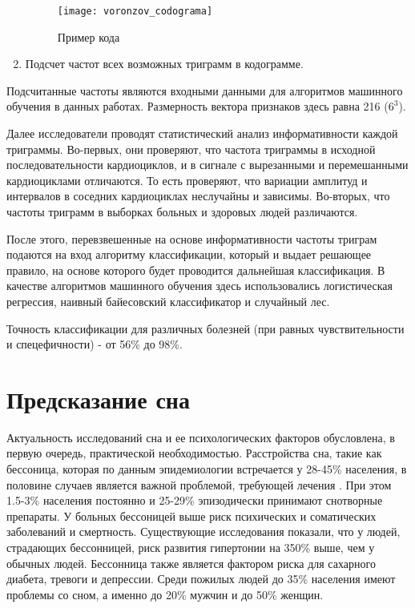 \begin{enumerate}
	\begin{figure}[h]
		\begin{center}
			\texttt{[image: voronzov\_codograma]}
			\caption{Пример кода}
			\label{ris:voronzov_codograma}
		\end{center}
	\end{figure}
	\item Подсчет частот всех возможных триграмм в кодограмме.
\end{enumerate}
Подсчитанные частоты являются входными данными для алгоритмов машинного обучения в данных работах. Размерность вектора признаков здесь равна 216 ($6^3$).
 
Далее исследователи проводят статистический анализ информативности каждой триграммы. Во-первых, они проверяют, что частота триграммы в исходной последовательности кардиоциклов, и в сигнале с вырезанными и перемешанными кардиоциклами отличаются. То есть проверяют, что вариации амплитуд и интервалов в соседних кардиоциклах неслучайны и зависимы. Во-вторых, что частоты триграмм в выборках больных и здоровых людей различаются.

После этого, перевзвешенные на основе информативности частоты триграм подаются на вход алгоритму классификации, который и выдает решающее правило, на основе которого будет проводится дальнейшая классификация. В качестве алгоритмов машинного обучения здесь использовались логистическая регрессия, наивный байесовский классификатор и случайный лес.

Точность классификации для различных болезней (при равных чувствительности и спецефичности) - от 56\% до 98\%.

\section{Предсказание сна}
Актуальность исследований сна и ее психологических факторов обусловлена, в первую очередь, практической необходимостью. 
Расстройства сна, такие как бессоница, которая по данным эпидемиологии встречается у 28-45\% населения, в половине случаев является важной проблемой, требующей лечения \cite{sleep3}.
При этом 1.5-3\% населения постоянно и 25-29\% эпизодически принимают снотворные препараты. 
У больных бессоницей выше риск психических и соматических заболеваний и смертность. Существующие исследования показали, что у людей, страдающих бессонницей, риск развития гипертонии на 350\% выше, чем у обычных людей. 
Бессонница также является фактором риска для сахарного диабета, тревоги и депрессии.
Среди пожилых людей до 35\% населения имеют проблемы со сном, а именно до 20\% мужчин и до 50\% женщин. \cite {sleep1, sleep2}

